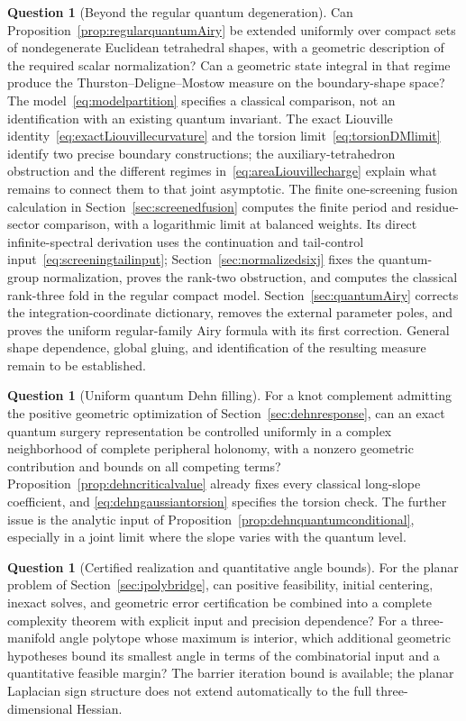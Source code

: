 \documentclass[11pt,a4paper]{article}
\numberwithin{equation}{section}
\theoremstyle{definition}
\newtheorem{question}[theorem]{Question}
\theoremstyle{remark}
\begin{document}
\begin{question}[Beyond the regular quantum degeneration]
Can Proposition~\ref{prop:regularquantumAiry} be extended uniformly
over compact sets of nondegenerate Euclidean tetrahedral shapes,
with a geometric description of the required scalar normalization?
Can a geometric state
integral in that regime produce the Thurston--Deligne--Mostow measure
on the boundary-shape space? The model~\eqref{eq:modelpartition}
specifies a classical comparison, not an identification with an
existing quantum invariant. The exact Liouville
identity~\eqref{eq:exactLiouvillecurvature} and the torsion
limit~\eqref{eq:torsionDMlimit} identify two precise boundary
constructions; the auxiliary-tetrahedron obstruction and the
different regimes in~\eqref{eq:areaLiouvillecharge} explain
what remains to connect them to that joint asymptotic.
The finite one-screening fusion calculation in
Section~\ref{sec:screenedfusion} computes the finite period and
residue-sector comparison, with a logarithmic limit at balanced
weights. Its direct infinite-spectral derivation uses the
continuation and tail-control input~\eqref{eq:screeningtailinput};
Section~\ref{sec:normalizedsixj} fixes the quantum-group
normalization, proves the rank-two obstruction, and computes
the classical rank-three fold in the regular compact model.
Section~\ref{sec:quantumAiry} corrects the integration-coordinate
dictionary, removes the external parameter poles, and proves the
uniform regular-family Airy formula with its first correction.
General shape dependence, global gluing, and identification of
the resulting measure remain to be established.
\end{question}

\begin{question}[Uniform quantum Dehn filling]
For a knot complement admitting the positive geometric optimization
of Section~\ref{sec:dehnresponse}, can an exact quantum surgery
representation be controlled uniformly in a complex neighborhood
of complete peripheral holonomy, with a nonzero geometric contribution
and bounds on all competing terms? Proposition~\ref{prop:dehncriticalvalue}
already fixes every classical long-slope coefficient, and
\eqref{eq:dehngaussiantorsion} specifies the torsion check. The further
issue is the analytic input of
Proposition~\ref{prop:dehnquantumconditional}, especially in a joint
limit where the slope varies with the quantum level.
\end{question}


\begin{question}[Certified realization and quantitative angle bounds]
For the planar problem of Section~\ref{sec:ipolybridge}, can positive
feasibility, initial centering, inexact solves, and geometric error
certification be combined into a complete complexity theorem with
explicit input and precision dependence? For a three-manifold angle
polytope whose maximum is interior, which additional geometric hypotheses
bound its smallest angle in terms of the combinatorial input and a
quantitative feasible margin? The barrier iteration bound is available;
the planar Laplacian sign structure does not extend automatically to
the full three-dimensional Hessian.
\end{question}
\end{document}

